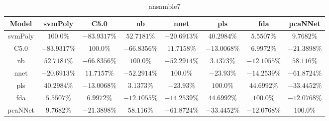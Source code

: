 \begin{table}[!ht]
	\centering
	\begin{tabular}{|c|c|c|c|c|c|c|c|}
		\hline
		Model & svmPoly & C5.0 & nb & nnet & pls & fda & pcaNNet \\ \hline
		svmPoly & $100.0\%$ & $-83.9317\%$ & $52.7181\%$ & $-20.6913\%$ & $40.2984\%$ & $5.5507\%$ & $9.7682\%$ \\ \hline
		C5.0 & $-83.9317\%$ & $100.0\%$ & $-66.8356\%$ & $11.7158\%$ & $-13.0068\%$ & $6.9972\%$ & $-21.3898\%$ \\ \hline
		nb & $52.7181\%$ & $-66.8356\%$ & $100.0\%$ & $-52.2914\%$ & $3.1373\%$ & $-12.1055\%$ & $58.116\%$ \\ \hline
		nnet & $-20.6913\%$ & $11.7157\%$ & $-52.2914\%$ & $100.0\%$ & $-23.93\%$ & $-14.2539\%$ & $-61.8724\%$ \\ \hline
		pls & $40.2984\%$ & $-13.0068\%$ & $3.1373\%$ & $-23.93\%$ & $100.0\%$ & $44.6992\%$ & $-33.4452\%$ \\ \hline
		fda & $5.5507\%$ & $6.9972\%$ & $-12.1055\%$ & $-14.2539\%$ & $44.6992\%$ & $100.0\%$ & $-12.0768\%$ \\ \hline
		pcaNNet & $9.7682\%$ & $-21.3898\%$ & $58.116\%$ & $-61.8724\%$ & $-33.4452\%$ & $-12.0768\%$ & $100.0\%$ \\ \hline
	\end{tabular}
	\caption{ansamble7}
	\label{tab:ansamble7}
\end{table}
